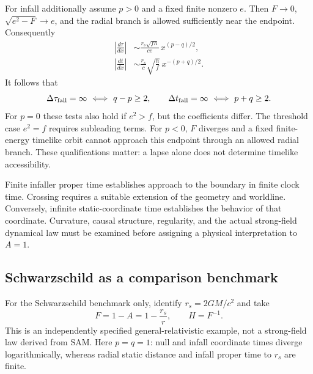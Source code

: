 \documentclass[10pt,twocolumn,letterpaper]{article}
\begin{document}
For infall additionally assume $p>0$ and a fixed finite nonzero $e$.
Then $F\to0$, $\sqrt{e^2-F}\to e$, and the radial branch is allowed
sufficiently near the endpoint. Consequently
\begin{equation}
 \begin{aligned}
 \left|\frac{d\tau}{dx}\right|&\sim\frac{r_s\sqrt{fh}}{ce}\,x^{(p-q)/2},\\
 \left|\frac{dt}{dx}\right|&\sim\frac{r_s}{c}\sqrt{\frac hf}\,x^{-(p+q)/2}.
 \end{aligned}
\end{equation}
It follows that
\begin{equation}
 \Delta\tau_{\rm fall}=\infty\ \Longleftrightarrow\ q-p\geq2,
 \qquad
 \Delta t_{\rm fall}=\infty\ \Longleftrightarrow\ p+q\geq2.
 \label{eq:ch5-proper-criterion}
\end{equation}
For $p=0$ these tests also hold if $e^2>f$, but the coefficients differ.
The threshold case $e^2=f$ requires subleading terms. For $p<0$, $F$
diverges and a fixed finite-energy timelike orbit cannot approach this
endpoint through an allowed radial branch. These qualifications matter:
a lapse alone does not determine timelike accessibility.

Finite infaller proper time establishes approach to the boundary in finite
clock time. Crossing requires a suitable extension of the geometry and
worldline. Conversely, infinite static-coordinate time establishes the
behavior of that coordinate. Curvature, causal structure, regularity, and
the actual strong-field dynamical law must be examined before assigning
a physical interpretation to $A=1$.

\subsection{Schwarzschild as a comparison benchmark}
For the Schwarzschild benchmark only, identify $r_s=2GM/c^2$ and take
\begin{equation}
 F=1-A=1-\frac{r_s}{r},\qquad H=F^{-1}.
 \label{eq:ch5-schwarzschild-benchmark}
\end{equation}
This is an independently specified general-relativistic example, not a
strong-field law derived from SAM.\cite{kruskal,tong} Here $p=q=1$: null and infall coordinate
times diverge logarithmically, whereas radial static distance and infall
proper time to $r_s$ are finite.
\end{document}
